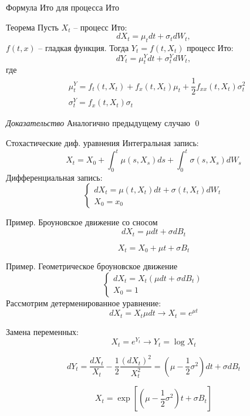 \documentclass{beamer}
\begin{document}
\begin{frame}{Формула Ито для процесса Ито}
    \begin{block}{Теорема}
    Пусть $X_t$ -- процесс Ито:
    $$
        dX_t = \mu_t dt + \sigma_t dW_t,
    $$ $f(t, x)$ -- гладкая функция. Тогда $Y_t = f(t, X_t)$ процесс Ито:
    $$
        dY_t = \mu^Y_t dt + \sigma^Y_t dW_t,
    $$где 
    \begin{align*}
        &\mu^Y_t = f_t(t, X_t) + f_x(t, X_t) \mu_t + \dfrac{1}{2} f_{xx}(t, X_t) \sigma_t^2 \\
        &\sigma_t^Y = f_x(t, X_t) \sigma_t 
    \end{align*}
     \end{block}
    \textit{Доказательство} Аналогично предыдущему случаю \qed
\end{frame}

\begin{frame}{Стохастические диф. уравнения}
    Интегральная запись:
    $$
        X_t = X_0 + \int_0^t \mu(s, X_s) ds + \int_0^t \sigma(s, X_s) dW_s
    $$
    Дифференциальная запись:
    $$
        \begin{cases}
            d X_t = \mu(t, X_t) dt + \sigma(t, X_t) dW_t \\
            X_0 = x_0
        \end{cases}
    $$
\end{frame}

\begin{frame}{Пример. Броуновское движение со сносом}
    $$
        dX_t = \mu dt + \sigma dB_t 
    $$
     
    $$
        X_t = X_0 + \mu t + \sigma B_t
    $$
\end{frame}

\begin{frame}{Пример. Геометрическое броуновское движение}
    $$\begin{cases}
            dX_t = X_t \left( \mu dt + \sigma dB_t \right) \\
            X_0 = 1
    \end{cases}$$
      Рассмотрим детерменированное уравнение:
    $$
        dX_t = X_t \mu dt \to X_t = e^{\mu t}
    $$
     
    Замена переменных:
    $$X_t = e^{Y_t} \longrightarrow  Y_t = \log X_t$$
      
    $$d Y_t = \dfrac{d X_t}{X_t} - \dfrac{1}{2} \dfrac{(dX_t)^2}{X_t^2} =\left( \mu - \dfrac{1}{2}\sigma^2 \right) dt + \sigma dB_t$$
     
    $$X_t = \exp\left[ \left( \mu - \dfrac{1}{2}\sigma^2 \right) t + \sigma B_t \right]$$
\end{frame}
\end{document}
